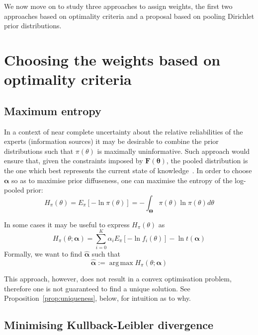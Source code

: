 \documentclass[a4paper, notitlepage, 11pt]{article}
\DeclareMathOperator*{\argmax}{arg\,max}
\begin{document}
We now move on to study three approaches to assign weights, the first two approaches based on optimality criteria and a proposal based on pooling Dirichlet prior distributions.


\section*{Choosing the weights based on optimality criteria}
\subsection*{Maximum entropy}

In a context of near complete uncertainty about the relative reliabilities of the experts (information sources) it may be desirable to combine the prior distributions such that $\pi(\theta)$ is maximally uninformative.
Such approach would ensure that, given the constraints imposed by $\mathbf{F(\theta)}$, the pooled distribution is the one which best represents the current state of knowledge~\citep{jaynes1957,savchuk1994}.
In order to choose $\boldsymbol\alpha$ so as to maximise prior 
diffuseness, one can maximise the entropy of the log-pooled prior:
\begin{equation}
\label{eq:entropypiA}
H_{\pi}(\theta) = E_{\pi}\left[-\ln\pi(\theta) \right] =-\int_{\boldsymbol\Theta}\pi(\theta)\ln\pi(\theta)d\theta 
\end{equation}

In some cases it may be useful to express $H_{\pi}(\theta)$ as
\begin{equation}
\label{eq:entropypiB}
 H_{\pi}(\theta; \boldsymbol\alpha) = \sum_{i=0}^{K} \alpha_i E_{\pi}[ - \ln f_i(\theta)] - \ln t(\boldsymbol\alpha)
\end{equation}
Formally, we want to find $\hat{\boldsymbol\alpha}$ such that
\begin{equation}
\label{eq:argmaxEnt}
 \hat{\boldsymbol\alpha}:= \argmax H_{\pi}(\theta; \boldsymbol\alpha)  
\end{equation}

This approach, however, does not result in a convex optimisation problem, therefore one is not guaranteed to find a unique solution. 
See Proposition~\ref{prop:uniqueness}, below, for intuition as to why.

\subsection*{Minimising Kullback-Leibler divergence}
\end{document}
